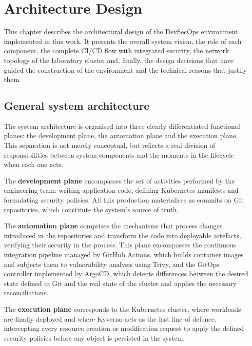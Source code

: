 \chapter{Architecture Design}

This chapter describes the architectural design of the DevSecOps environment implemented in this work. It presents the overall system vision, the role of each component, the complete CI/CD flow with integrated security, the network topology of the laboratory cluster and, finally, the design decisions that have guided the construction of the environment and the technical reasons that justify them.

\section{General system architecture}

The system architecture is organised into three clearly differentiated functional planes: the development plane, the automation plane and the execution plane. This separation is not merely conceptual, but reflects a real division of responsibilities between system components and the moments in the lifecycle when each one acts.

The \textbf{development plane} encompasses the set of activities performed by the engineering team: writing application code, defining Kubernetes manifests and formulating security policies. All this production materialises as commits on Git repositories, which constitute the system's source of truth.

The \textbf{automation plane} comprises the mechanisms that process changes introduced in the repositories and transform the code into deployable artefacts, verifying their security in the process. This plane encompasses the continuous integration pipeline managed by GitHub Actions, which builds container images and subjects them to vulnerability analysis using Trivy, and the GitOps controller implemented by ArgoCD, which detects differences between the desired state defined in Git and the real state of the cluster and applies the necessary reconciliations.

The \textbf{execution plane} corresponds to the Kubernetes cluster, where workloads are finally deployed and where Kyverno acts as the last line of defence, intercepting every resource creation or modification request to apply the defined security policies before any object is persisted in the system.

